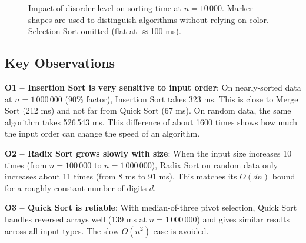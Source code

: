 \documentclass[12pt,a4paper]{article}
\theoremstyle{definition}
\begin{document}
\begin{figure}[h!]
\centering
{}
\caption{Impact of disorder level on sorting time at $n=10\,000$. Marker shapes are used to distinguish algorithms without relying on color. Selection Sort omitted (flat at $\approx$100 ms).}
\label{fig:partial}
\end{figure}

\subsection{Key Observations}

\textbf{O1 -- Insertion Sort is very sensitive to input order}: On nearly-sorted data at $n=1\,000\,000$ (90\% factor), Insertion Sort takes 323 ms. This is close to Merge Sort (212 ms) and not far from Quick Sort (67 ms). On random data, the same algorithm takes 526\,543 ms. This difference of about 1600 times shows how much the input order can change the speed of an algorithm.

\textbf{O2 -- Radix Sort grows slowly with size}: When the input size increases 10 times (from $n=100\,000$ to $n=1\,000\,000$), Radix Sort on random data only increases about 11 times (from 8 ms to 91 ms). This matches its $O(dn)$ bound for a roughly constant number of digits $d$.

\textbf{O3 -- Quick Sort is reliable}: With median-of-three pivot selection, Quick Sort handles reversed arrays well (139 ms at $n=1\,000\,000$) and gives similar results across all input types. The slow $O(n^2)$ case is avoided.
\end{document}
